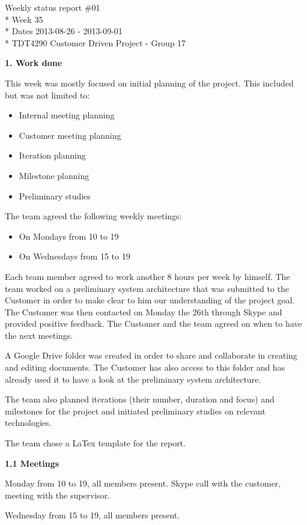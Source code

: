 \begin{center}
Weekly status report \#01\\*
Week 35 \\*
Dates 2013-08-26 - 2013-09-01 \\*
TDT4290 Customer Driven Project - Group 17
\end{center}

\textbf{1. Work done}

This week was mostly focused on initial planning of the project.
This included but was not limited to:
\begin{itemize}
\item Internal meeting planning
\item Customer meeting planning
\item Iteration planning
\item Milestone planning
\item Preliminary studies
\end{itemize}


The team agreed the following weekly meetings:
\begin{itemize}
\item On Mondays from 10 to 19
\item On Wednesdays from 15 to 19
\end{itemize}

Each team member agreed to work another 8 hours per week by himself.
The team worked on a preliminary system architecture that was submitted
to the Customer in order to make clear to him our understanding of the project goal. The Customer was then contacted on Monday the 26th through Skype and provided positive feedback.
The Customer and the team agreed on when to have the next meetings.

A Google Drive folder was created in order to share and collaborate in creating and editing documents. 
The Customer has also access to this folder and has already used it to have a look at the preliminary system architecture.

The team also planned iterations (their number, duration and focus) and milestones for the project and initiated preliminary studies on relevant technologies.

The team chose a LaTex template for the report.

\textbf{1.1 Meetings}

Monday
from 10 to 19, all members present.
Skype call with the customer, meeting with the supervisor.

Wednesday
from 15 to 19, all members present.

